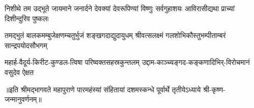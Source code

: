 
\addtocounter{shlokacount}{7}
\threelineshloka
{निशीथे तम उद्भूते जायमाने जनार्दने}
{देवक्यां देवरूपिण्यां विष्णुः सर्वगुहाशयः}
{आविरासीद्यथा प्राच्यां दिशीन्दुरिव पुष्कलः}

\fourlineindentedshloka
{तमद्भुतं बालकमम्बुजेक्षणम्}{चतुर्भुजं शङ्खगदाद्युदायुधम्}
{श्रीवत्सलक्ष्मं गलशोभिकौस्तुभम्}{पीताम्बरं सान्द्रपयोदसौभगम्}


\fourlineindentedshloka
{महार्ह-वैदूर्य-किरीट-कुण्डल-}{त्विषा परिष्वक्तसहस्रकुन्तलम्}
{उद्दाम-काञ्च्यङ्गद-कङ्कणादिभिर्-}{विरोचमानं वसुदेव ऐक्षत}

॥इति श्रीमद्भागवते महापुराणे पारमहंस्यां संहितायां दशमस्कन्धे पूर्वार्थे तृतीयेऽध्याये श्री-कृष्ण-जन्मानुवर्णनम्॥
